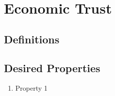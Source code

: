 \section{Economic Trust}
  \subsection{Definitions}

  \subsection{Desired Properties}
    \begin{enumerate}
      \item Property 1
    \end{enumerate}
